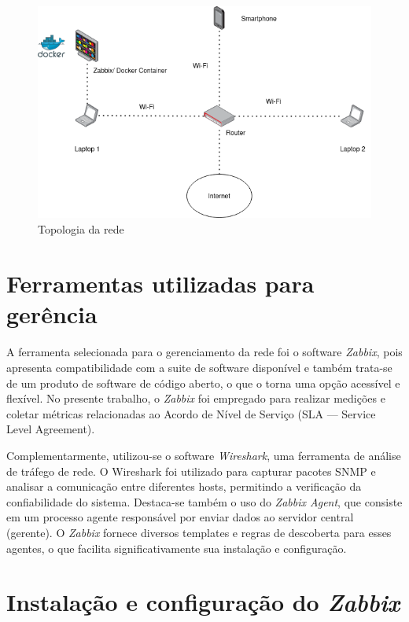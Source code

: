 \documentclass[12pt]{article}
\begin{document}
\begin{figure}[h!]
\centerline{\includegraphics[totalheight=6cm]{topologia.png}}
  \caption{Topologia da rede}
  \label{fig:topologia}
\end{figure}

\section{Ferramentas utilizadas para gerência}
\paragraph{}
A ferramenta selecionada para o gerenciamento da rede foi o software \textit{Zabbix}, pois apresenta compatibilidade com
a suite de software disponível e também trata-se de um produto de software de código aberto, o que o torna uma opção
acessível e flexível. No presente trabalho, o \textit{Zabbix} foi empregado para realizar medições e coletar métricas
relacionadas ao Acordo de Nível de Serviço (SLA --- Service Level Agreement).

Complementarmente, utilizou-se o software \textit{Wireshark}, uma ferramenta de análise de tráfego de rede. O Wireshark foi
utilizado para capturar pacotes SNMP e analisar a comunicação entre diferentes hosts, permitindo a verificação da
confiabilidade do sistema. Destaca-se também o uso do \textit{Zabbix Agent}, que consiste em um processo agente responsável por
enviar dados ao servidor central (gerente). O \textit{Zabbix} fornece diversos templates e regras de descoberta para esses agentes,
o que facilita significativamente sua instalação e configuração.

\section{Instalação e configuração do \textit{Zabbix}}
\end{document}
